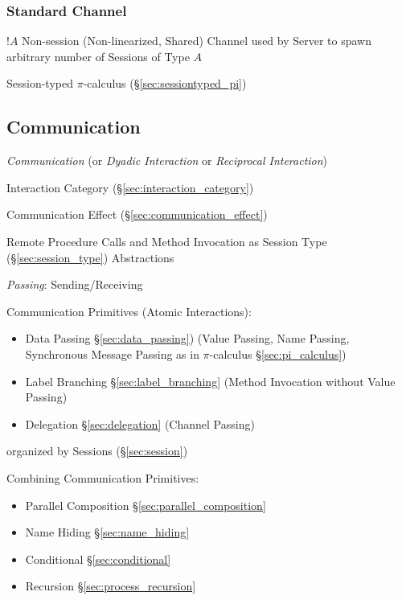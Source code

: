 \subsubsection{Standard Channel}\label{sec:standard_channel}

$!A$ Non-session (Non-linearized, Shared) Channel used by Server to
spawn arbitrary number of Sessions of Type $A$

Session-typed $\pi$-calculus (\S\ref{sec:sessiontyped_pi})



\subsection{Communication}\label{sec:communication}

\emph{Communication} (or \emph{Dyadic Interaction} or \emph{Reciprocal
  Interaction})

Interaction Category (\S\ref{sec:interaction_category})

Communication Effect (\S\ref{sec:communication_effect})

Remote Procedure Calls and Method Invocation as Session Type
(\S\ref{sec:session_type}) Abstractions
\cite{honda-vasconcelos-kubo98}

\emph{Passing}: Sending/Receiving

Communication Primitives (Atomic Interactions):
\cite{honda-vasconcelos-kubo98}
\begin{itemize}
  \item Data Passing \S\ref{sec:data_passing}) (Value Passing, Name
    Passing, Synchronous Message Passing as in $\pi$-calculus
    \S\ref{sec:pi_calculus})
  \item Label Branching \S\ref{sec:label_branching} (Method Invocation
    without Value Passing)
  \item Delegation \S\ref{sec:delegation} (Channel Passing)
\end{itemize}
organized by Sessions (\S\ref{sec:session})


Combining Communication Primitives:
\cite{honda-vasconcelos-kubo98}
\begin{itemize}
  \item Parallel Composition \S\ref{sec:parallel_composition}
  \item Name Hiding \S\ref{sec:name_hiding}
  \item Conditional \S\ref{sec:conditional}
  \item Recursion \S\ref{sec:process_recursion}
\end{itemize}


